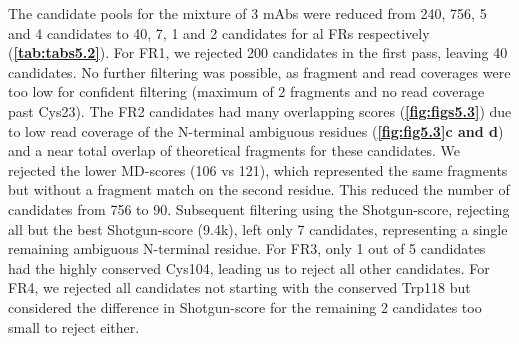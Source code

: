 The candidate pools for the mixture of 3 mAbs were reduced from 240, 756, 5 and 4 candidates to 40, 7, 1 and 2 candidates for al FRs respectively (\textbf{\autoref{tab:tabs5.2}}). For FR1, we rejected 200 candidates in the first pass, leaving 40 candidates. No further filtering was possible, as fragment and read coverages were too low for confident filtering (maximum of 2 fragments and no read coverage past Cys23). The FR2 candidates had many overlapping scores (\textbf{\autoref{fig:figs5.3}}) due to low read coverage of the N-terminal ambiguous residues (\textbf{\autoref{fig:fig5.3}c and d}) and a near total overlap of theoretical fragments for these candidates. We rejected the lower MD-scores (106 vs 121), which represented the same fragments but without a fragment match on the second residue. This reduced the number of candidates from 756 to 90. Subsequent filtering using the Shotgun-score, rejecting all but the best Shotgun-score (9.4k), left only 7 candidates, representing a single remaining ambiguous N-terminal residue. For FR3, only 1 out of 5 candidates had the highly conserved Cys104, leading us to reject all other candidates. For FR4, we rejected all candidates not starting with the conserved Trp118 but considered the difference in Shotgun-score for the remaining 2 candidates too small to reject either.

